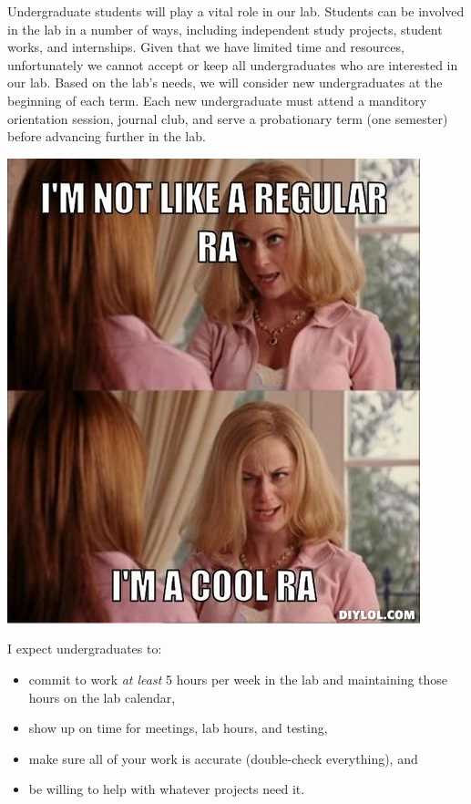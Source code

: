 \documentclass[]{book}
\providecommand{\tightlist}{%
  \setlength{\itemsep}{0pt}\setlength{\parskip}{0pt}}
\begin{document}
Undergraduate students will play a vital role in our lab. Students can be involved in the lab in a number of ways, including independent study projects, student works, and internships. Given that we have limited time and resources, unfortunately we cannot accept or keep all undergraduates who are interested in our lab. Based on the lab's needs, we will consider new undergraduates at the beginning of each term. Each new undergraduate must attend a manditory orientation session, journal club, and serve a probationary term (one semester) before advancing further in the lab.

\includegraphics{images/RAmeme.jpg}

I expect undergraduates to:

\begin{itemize}
\tightlist
\item
  commit to work \emph{at least} 5 hours per week in the lab and maintaining those hours on the lab calendar,
\item
  show up on time for meetings, lab hours, and testing,\\
\item
  make sure all of your work is accurate (double-check everything), and
\item
  be willing to help with whatever projects need it.
\end{itemize}
\end{document}
